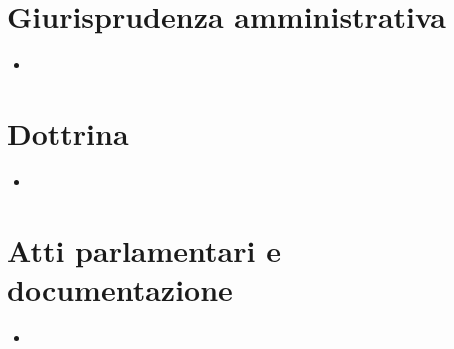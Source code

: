 \section*{Giurisprudenza amministrativa}
\begin{itemize}\setlength{\itemsep}{0.2em}
  \item %
\end{itemize}

\section*{Dottrina}
\begin{itemize}\setlength{\itemsep}{0.2em}
  \item %
\end{itemize}

\section*{Atti parlamentari e documentazione}
\begin{itemize}\setlength{\itemsep}{0.2em}
  \item %
\end{itemize}
